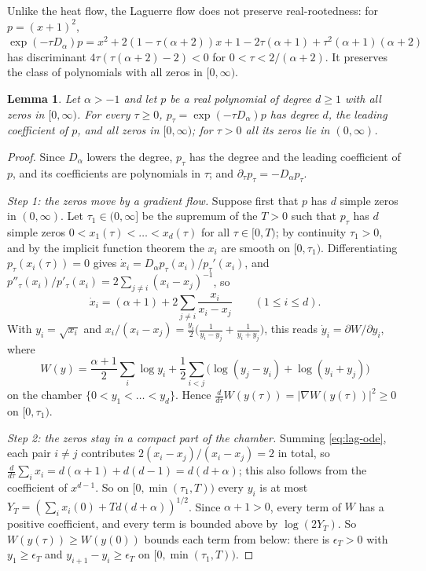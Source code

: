 \documentclass[11pt]{amsart}
\newtheorem{lemma}[theorem]{Lemma}
\theoremstyle{definition}
\theoremstyle{remark}
\numberwithin{equation}{section}
\begin{document}
Unlike the heat flow, the Laguerre flow does not preserve real-rootedness: for $p=(x+1)^2$, $\exp(-\tau D_\alpha)p=x^2+2(1-\tau(\alpha+2))x+1-2\tau(\alpha+1)+\tau^2(\alpha+1)(\alpha+2)$ has discriminant $4\tau(\tau(\alpha+2)-2)<0$ for $0<\tau<2/(\alpha+2)$. It preserves the class of polynomials with all zeros in $[0,\infty)$.

\begin{lemma}\label{lem:lag-preserve}
Let $\alpha>-1$ and let $p$ be a real polynomial of degree $d\ge1$ with all zeros in $[0,\infty)$. For every $\tau\ge0$, $p_\tau=\exp(-\tau D_\alpha)p$ has degree $d$, the leading coefficient of $p$, and all zeros in $[0,\infty)$; for $\tau>0$ all its zeros lie in $(0,\infty)$.
\end{lemma}

\begin{proof}
Since $D_\alpha$ lowers the degree, $p_\tau$ has the degree and the leading coefficient of $p$, and its coefficients are polynomials in $\tau$; and $\partial_\tau p_\tau=-D_\alpha p_\tau$.

\emph{Step 1: the zeros move by a gradient flow.} Suppose first that $p$ has $d$ simple zeros in $(0,\infty)$. Let $\tau_1\in(0,\infty]$ be the supremum of the $T>0$ such that $p_\tau$ has $d$ simple zeros $0<x_1(\tau)<\dots<x_d(\tau)$ for all $\tau\in[0,T)$; by continuity $\tau_1>0$, and by the implicit function theorem the $x_i$ are smooth on $[0,\tau_1)$. Differentiating $p_\tau(x_i(\tau))=0$ gives $\dot x_i=D_\alpha p_\tau(x_i)/p_\tau'(x_i)$, and $p''_\tau(x_i)/p'_\tau(x_i)=2\sum_{j\ne i}(x_i-x_j)^{-1}$, so
\begin{equation}\label{eq:lag-ode}
\dot x_i=(\alpha+1)+2\sum_{j\ne i}\frac{x_i}{x_i-x_j}\qquad(1\le i\le d).
\end{equation}
With $y_i=\sqrt{x_i}$ and $x_i/(x_i-x_j)=\frac{y_i}2\bigl(\frac1{y_i-y_j}+\frac1{y_i+y_j}\bigr)$, this reads $\dot y_i=\partial W/\partial y_i$, where
\[
W(y)=\frac{\alpha+1}2\sum_i\log y_i+\frac12\sum_{i<j}\bigl(\log(y_j-y_i)+\log(y_i+y_j)\bigr)
\]
on the chamber $\{0<y_1<\dots<y_d\}$. Hence $\frac d{d\tau}W(y(\tau))=|\nabla W(y(\tau))|^2\ge0$ on $[0,\tau_1)$.

\emph{Step 2: the zeros stay in a compact part of the chamber.} Summing \eqref{eq:lag-ode}, each pair $i\ne j$ contributes $2(x_i-x_j)/(x_i-x_j)=2$ in total, so $\frac d{d\tau}\sum_ix_i=d(\alpha+1)+d(d-1)=d(d+\alpha)$; this also follows from the coefficient of $x^{d-1}$. So on $[0,\min(\tau_1,T))$ every $y_i$ is at most $Y_T=(\sum_ix_i(0)+Td(d+\alpha))^{1/2}$. Since $\alpha+1>0$, every term of $W$ has a positive coefficient, and every term is bounded above by $\log(2Y_T)$. So $W(y(\tau))\ge W(y(0))$ bounds each term from below: there is $\epsilon_T>0$ with $y_1\ge\epsilon_T$ and $y_{i+1}-y_i\ge\epsilon_T$ on $[0,\min(\tau_1,T))$.


\end{proof}
\end{document}
